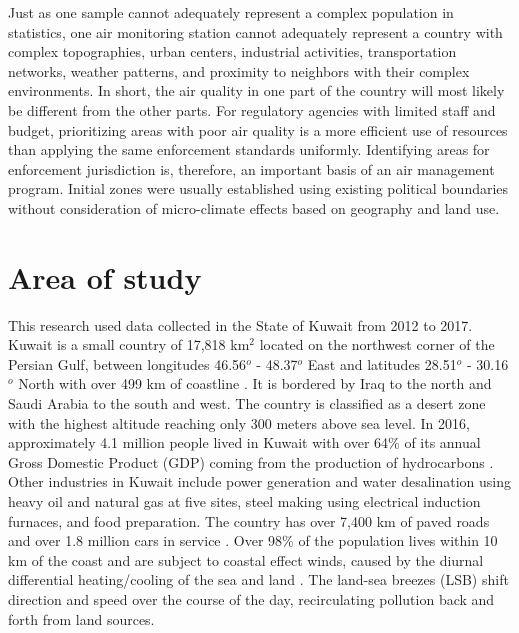 Just as one sample cannot adequately represent a complex population in statistics, one air monitoring station cannot adequately represent a country with complex topographies, urban centers, industrial activities, transportation networks, weather patterns, and proximity to neighbors with their complex environments.  In short, the air quality in one part of the country will most likely be different from the other parts. For regulatory agencies with limited staff and budget, prioritizing areas with poor air quality is a more efficient use of resources than applying the same enforcement standards uniformly. Identifying areas for enforcement jurisdiction is, therefore, an important basis of an air management program. Initial zones were usually established using existing political boundaries without consideration of micro-climate effects based on geography and land use.  

\section{Area of study}

This research used data collected in the State of Kuwait from 2012 to 2017. Kuwait is a small country of 17,818 km$^{2}$ located on the northwest corner of the Persian Gulf, between longitudes 46.56$^{o}$ - 48.37$^{o}$ East and latitudes 28.51$^{o}$ - 30.16$^{o}$ North with over 499 km of coastline \citep{CIA2015}. It is bordered by Iraq to the north and Saudi Arabia to the south and west. The country is classified as a desert zone with the highest altitude reaching only 300 meters above sea level.   In 2016, approximately 4.1 million people lived in Kuwait \citep{CSB2017} with over 64\% of its annual Gross Domestic Product (GDP) coming from the production of hydrocarbons \citep{KAMCO2013}.  Other industries in Kuwait include power generation and water desalination using heavy oil and natural gas at five sites, steel making using electrical induction furnaces, and food preparation.  The country has over 7,400 km of paved roads and over 1.8 million cars in service \citep{CSB2014}.  Over 98\% of the population lives within 10 km of the coast and are subject to coastal effect winds, caused by the diurnal differential heating/cooling of the sea and land \citep{Crosman2010, Cuxart2014}.  The land-sea breezes (LSB) shift direction and speed over the course of the day, recirculating pollution back and forth from land sources.


